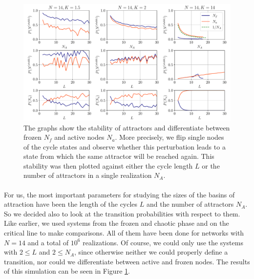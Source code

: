 \paragraph*{}
\begin{figure}
	\includegraphics[width=\textwidth]{Plots/single_flip_stability_N14}
	\centering
	\caption{
		The graphs show the stability of attractors and differentiate between frozen $N_f$ and active nodes $N_a$. More precisely, we flip single nodes of the cycle states and observe whether this perturbation leads to a state from which the same attractor will be reached again. This stability was then plotted against either the cycle length $L$ or the number of attractors in a single realization $N_A$.}
	\label{fig:single_flip}
\end{figure}

\paragraph*{}
For us, the most important parameters for studying the sizes of the basins of attraction have been the length of the cycles $L$ and the number of attractors $N_A$. So we decided also to look at the transition probabilities with respect to them. Like earlier, we used systems from the frozen and chaotic phase and on the critical line to make comparisons. All of them have been done for networks with $N=14$ and a total of $10^6$ realizations. Of course, we could only use the systems with $2\leq L$ and $2\leq N_A$, since otherwise neither we could properly define a transition, nor could we differentiate between active and frozen nodes. The results of this simulation can be seen in Figure \ref{fig:single_flip}.

